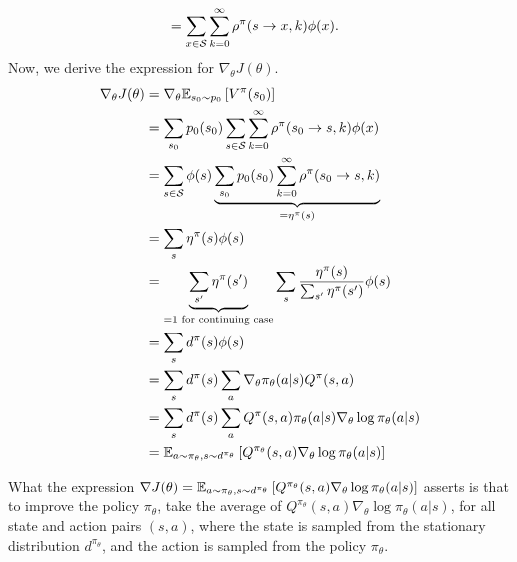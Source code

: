 \documentclass{article}
\begin{document}
\begin{tcolorbox}[breakable,enhanced,colback=gray!10!white,colframe=gray!50!black,
title={Policy Gradient Derivation for $J(\theta) = \BBE_{s_0\sim p_0}\left[V^{\pi_\theta}(s_0)\right]$}]
\begin{align*}
    &=\sum_{x\in{\mathcal S}} \sum_{k=0}^\infty \rho^\pi(s\to x, k)\phi(x).
\end{align*}
Now, we derive the expression for $\nabla_\theta J(\theta)$.
\begin{align*}
    \nabla_\theta J(\theta) &= \nabla_\theta {\mathbb E}_{s_0\sim p_0}\left[V^{\pi}(s_0)\right]\\    
    &=\sum_{s_0}p_0(s_0)\sum_{s\in{\mathcal S}}\sum_{k=0}^\infty \rho^\pi(s_0\to s, k)\phi(x) \\
    &=\sum_{s\in{\mathcal S}} \phi(s)\underbrace{\sum_{s_0}p_0(s_0)\sum_{k=0}^\infty \rho^\pi(s_0\to s, k)}_{=\eta^\pi(s)} \\
    &= \sum_{s}\eta^\pi(s)\phi(s)\\
    &=\underbrace{\sum_{s^\prime}\eta^\pi(s^\prime)}_{=1 \text{ for continuing case}} \sum_{s}\frac{\eta^\pi(s)}{\sum_{s^\prime}\eta^\pi(s^\prime)}\phi(s)\\
    &=\sum_{s}d^\pi(s)\phi(s)\\
    &=\sum_{s}d^\pi(s)\sum_a \nabla_\theta\pi_\theta(a|s) Q^\pi(s,a)\\
    &=\sum_{s}d^\pi(s)\sum_a  Q^\pi(s,a)\pi_\theta(a|s)\nabla_\theta\log\pi_\theta(a|s)\\
    &={\mathbb E}_{a \sim\pi_\theta, s\sim d^{\pi_\theta}} \left[Q^{\pi_\theta}(s,a)\nabla_\theta\log\pi_\theta(a|s)\right]\\
\end{align*}
\end{tcolorbox}

What the expression $\nabla J(\theta) = {\mathbb E}_{a \sim\pi_\theta, s\sim d^{\pi_\theta}} \left[Q^{\pi_\theta}(s,a)\nabla_\theta\log\pi_\theta(a|s)\right]$ asserts is that to improve the policy $\pi_\theta$, take the average of $Q^{\pi_\theta}(s,a)\nabla_\theta\log\pi_\theta(a|s)$, for all state and action pairs $(s, a)$, where the state is sampled from the stationary distribution $d^{\pi_\theta}$, and the action is sampled from the policy $\pi_\theta$.
\end{document}
